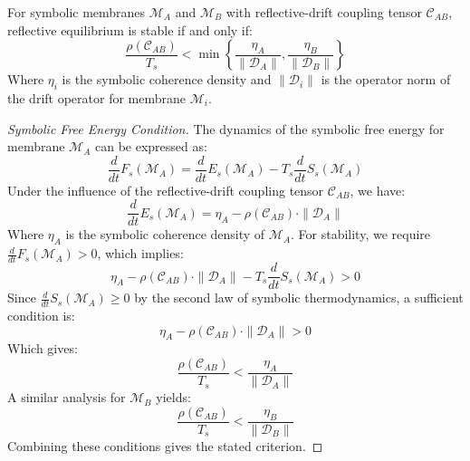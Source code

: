 \begin{theorem} \label{theorem:bk5_reflective_stability_criterion}
For symbolic membranes $\mathscr{M}_A$ and $\mathscr{M}_B$ with reflective-drift coupling tensor $\mathcal{C}_{AB}$, reflective equilibrium is stable if and only if:
\begin{equation}
\frac{\rho(\mathcal{C}_{AB})}{T_s} < \min\left\{\frac{\eta_A}{\|\mathscr{D}_A\|}, \frac{\eta_B}{\|\mathscr{D}_B\|}\right\}
\end{equation}
Where $\eta_i$ is the symbolic coherence density and $\|\mathscr{D}_i\|$ is the operator norm of the drift operator for membrane $\mathscr{M}_i$.
\end{theorem}
\begin{proof}[Symbolic Free Energy Condition]
\label{proof:bk5_symbolic_free_energy_stability_condition}
The dynamics of the symbolic free energy for membrane $\mathscr{M}_A$ can be expressed as:
\begin{equation}
\frac{d}{dt}F_s(\mathscr{M}_A) = \frac{d}{dt}E_s(\mathscr{M}_A) - T_s\frac{d}{dt}S_s(\mathscr{M}_A)
\end{equation}
Under the influence of the reflective-drift coupling tensor $\mathcal{C}_{AB}$, we have:
\begin{equation}
\frac{d}{dt}E_s(\mathscr{M}_A) = \eta_A - \rho(\mathcal{C}_{AB}) \cdot \|\mathscr{D}_A\|
\end{equation}
Where $\eta_A$ is the symbolic coherence density of $\mathscr{M}_A$.
For stability, we require $\frac{d}{dt}F_s(\mathscr{M}_A) > 0$, which implies:
\begin{equation}
\eta_A - \rho(\mathcal{C}_{AB}) \cdot \|\mathscr{D}_A\| - T_s\frac{d}{dt}S_s(\mathscr{M}_A) > 0
\end{equation}
Since $\frac{d}{dt}S_s(\mathscr{M}_A) \geq 0$ by the second law of symbolic thermodynamics, a sufficient condition is:
\begin{equation}
\eta_A - \rho(\mathcal{C}_{AB}) \cdot \|\mathscr{D}_A\| > 0
\end{equation}
Which gives:
\begin{equation}
\frac{\rho(\mathcal{C}_{AB})}{T_s} < \frac{\eta_A}{\|\mathscr{D}_A\|}
\end{equation}
A similar analysis for $\mathscr{M}_B$ yields:
\begin{equation}
\frac{\rho(\mathcal{C}_{AB})}{T_s} < \frac{\eta_B}{\|\mathscr{D}_B\|}
\end{equation}
Combining these conditions gives the stated criterion.
\end{proof}
